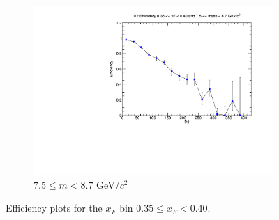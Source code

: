 \begin{figure}[p]
\begin{subfigure}[b]{0.32\textwidth}
        \includegraphics[width=\textwidth]{./kTrackerEfficiencyPlots/D2_Efficiency_xF7_mass10.pdf}
        \caption{$7.5 \leq m < 8.7$ GeV/$c^2$}
        \label{fig:xF7_mass10}
    \end{subfigure}
    \hfill
    \caption{Efficiency plots for the $x_F$ bin $0.35 \leq x_F < 0.40$.}
    \label{fig:xF7}
\end{figure}

\clearpage

